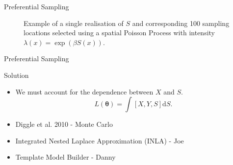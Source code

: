 \documentclass{beamer}
\begin{document}
\begin{frame}{Preferential Sampling}

\begin{figure}
\centering
\caption{Example of a single realisation of $S$ and corresponding 100 sampling locations selected using a spatial Poisson Process with intensity $\lambda(x)=\exp(\beta S(x))$.\label{fig:PrefSimPlot}}
\end{figure}
\end{frame}

\begin{frame}{Preferential Sampling}
\begin{block}{Solution}
\begin{itemize}
\item We must account for the dependence between $X$ and $S$.
\begin{equation}
L(\boldsymbol{\theta})=\int \left[X,Y,S\right]\mathrm{d}S.
\end{equation}
\item Diggle et al. 2010 - Monte Carlo 
\item Integrated Nested Laplace Approximation (INLA) - Joe
\item Template Model Builder - Danny
\end{itemize}
\end{block}
\end{frame}
\end{document}
